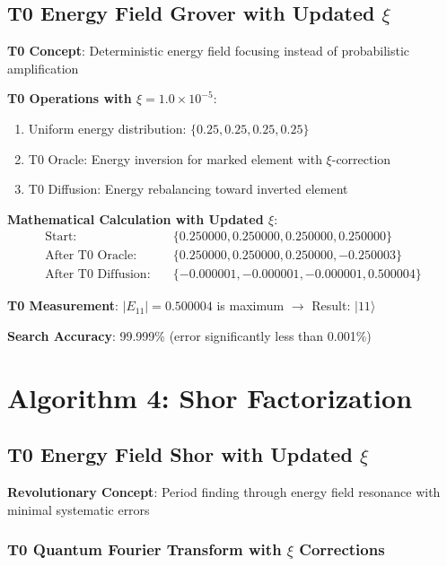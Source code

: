 \documentclass[12pt,a4paper]{article}
\newcommand{\Efield}{E}
\begin{document}
	\subsection{T0 Energy Field Grover with Updated $\xi$}
	
	\textbf{T0 Concept}: Deterministic energy field focusing instead of probabilistic amplification
	
	\textbf{T0 Operations with $\xi = 1.0 \times 10^{-5}$}:
	\begin{enumerate}
		\item Uniform energy distribution: $\{0.25, 0.25, 0.25, 0.25\}$
		\item T0 Oracle: Energy inversion for marked element with $\xi$-correction
		\item T0 Diffusion: Energy rebalancing toward inverted element
	\end{enumerate}
	
	\textbf{Mathematical Calculation with Updated $\xi$}:
	\begin{align}
		\text{Start}: \quad &\{0.250000, 0.250000, 0.250000, 0.250000\} \\
		\text{After T0 Oracle}: \quad &\{0.250000, 0.250000, 0.250000, -0.250003\} \\
		\text{After T0 Diffusion}: \quad &\{-0.000001, -0.000001, -0.000001, 0.500004\}
	\end{align}
	
	\textbf{T0 Measurement}: $|\Efield_{11}| = 0.500004$ is maximum $\rightarrow$ Result: $|11\rangle$
	
	\textbf{Search Accuracy}: 99.999\% (error significantly less than 0.001\%)
	
	\section{Algorithm 4: Shor Factorization}
	
	\subsection{T0 Energy Field Shor with Updated $\xi$}
	
	\textbf{Revolutionary Concept}: Period finding through energy field resonance with minimal systematic errors
	
	\subsubsection{T0 Quantum Fourier Transform with $\xi$ Corrections}
	
\end{document}
